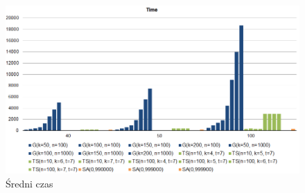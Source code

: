 \documentclass[wide,a4paper,titlepage,12pt] {article}
\begin{document}
\begin{landscape}
\begin{figure}[htbp]
  \begin{center}
         \includegraphics[scale = 1.0]{img/timeAll.PNG}
         \caption{Średni czas}
  \end{center}
\end{figure}
\end{landscape}
\end{document}
